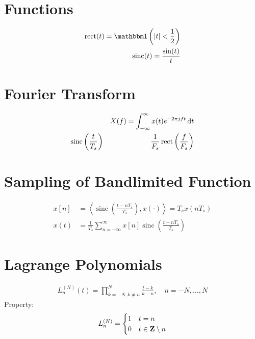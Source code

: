 \documentclass[a4paper]{IEEEtran}
\DeclareMathOperator{\rect}{rect}
\DeclareMathOperator{\sinc}{sinc}
\begin{document}
\section{Functions}
\begin{align}
\rect(t)=\true\left(|t|<\frac{1}{2}\right)\\\
\sinc(t)=\frac{\sin(t)}{t}
\end{align}
\section{Fourier Transform}
\begin{align}
&&X(f)=\int_{-\infty}^\infty x(t)e^{-2\pi j ft}\de t\\
\sinc\left(\frac{t}{T_s}\right)&&\frac{1}{F_s}\rect\left(\frac{f}{F_s}\right)
\end{align}
\section{Sampling of Bandlimited Function}
\begin{align}
x[n] &= \left<\sinc\left(\frac{t-nT_s}{T_s}\right), x(\cdot)\right>=T_s x(nT_s)\\
x(t) &= \frac{1}{T_s}\sum_{n=-\infty}^\infty x[n]\sinc\left(\frac{t-nT_s}{T_s}\right)
\end{align}
\section{Lagrange Polynomials}
\begin{align}
L_n^{(N)}(t)=\prod_{k=-N, k\neq n}^N \frac{t-k}{k-n},\quad n=-N,\dotsc, N
\end{align}
Property:
\begin{align*}
L_n^{(N)}=\begin{cases}1& t=n\\0 & t\in \mathbf{Z}\setminus n\end{cases}
\end{align*}
\end{document}
